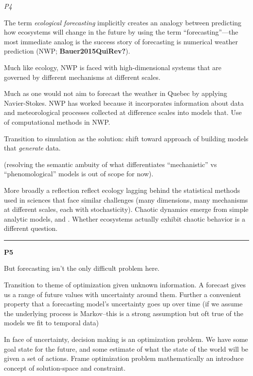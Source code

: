 \documentclass[11pt]{article}
\begin{document}
\emph{P4}

The term \emph{ecological forecasting} implicitly creates an analogy
between predicting how ecosystems will change in the future by using the
term ``forecasting''---the most immediate analog is the success story of
forecasting is numerical weather prediction (NWP;
\textbf{Bauer2015QuiRev?}).

Much like ecology, NWP is faced with high-dimensional systems that are
governed by different mechanisms at different scales.

Much as one would not aim to forecast the weather in Quebec by applying
Navier-Stokes. NWP has worked because it incorporates information about
data and meteorological processes collected at difference scales into
models that. Use of computational methods in NWP.

Transition to simulation as the solution: shift toward approach of
building models that \emph{generate} data.

(resolving the semantic ambuity of what differentiates ``mechanistic''
vs ``phenomological'' models is out of scope for now).

More broadly a reflection reflect ecology lagging behind the statistical
methods used in sciences that face similar challenges (many dimensions,
many mechanisms at different scales, each with stochasticity). Chaotic
dynamics emerge from simple analytic models, and . Whether ecosystems
actually exhibit chaotic behavior is a different question.

\begin{center}\rule{0.5\linewidth}{0.5pt}\end{center}

\textbf{P5}

But forecasting isn't the only difficult problem here.

Transition to theme of optimization given unknown information. A
forecast gives us a range of future values with uncertainty around them.
Further a convenient property that a forecasting model's uncertainty
goes up over time (if we assume the underlying process is Markov--this
is a strong assumption but oft true of the models we fit to temporal
data)

In face of uncertainty, decision making is an optimization problem. We
have some goal state for the future, and some estimate of what the state
of the world will be given a set of actions. Frame optimization problem
mathematically an introduce concept of solution-space and constraint.
\end{document}

